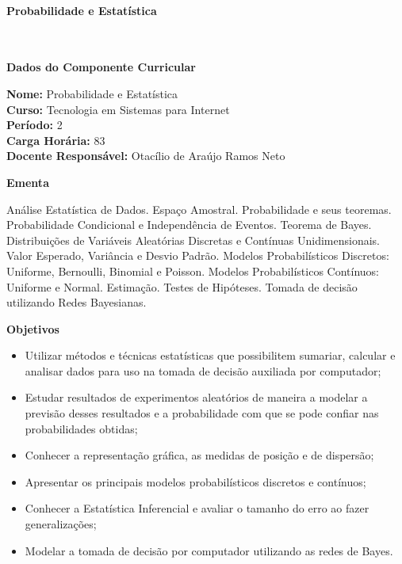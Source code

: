 \paragraph{Probabilidade e Estatística} \


\begin{snugshade}\begin{center}\textbf{
	Dados do Componente Curricular
}\end{center}\end{snugshade}

\noindent	\textbf{Nome:} Probabilidade e Estatística
\\ 			\textbf{Curso:} Tecnologia em Sistemas para Internet
\\ 			\textbf{Período:} \unit{2}{\degree}
\\ 			\textbf{Carga Horária:} \unit{83}{\hour}
\\ 			\textbf{Docente Responsável:} Otacílio de Araújo Ramos Neto


\begin{snugshade}\begin{center}\textbf{
    Ementa
\vphantom{q}}\end{center}\end{snugshade}

\noindent
Análise Estatística de Dados. Espaço Amostral. Probabilidade e seus teoremas. Probabilidade Condicional e Independência de Eventos. Teorema de Bayes. Distribuições de Variáveis Aleatórias Discretas e Contínuas Unidimensionais. Valor Esperado, Variância e Desvio Padrão. Modelos Probabilísticos Discretos: Uniforme, Bernoulli, Binomial e Poisson. Modelos Probabilísticos Contínuos: Uniforme e Normal. Estimação. Testes de Hipóteses. Tomada de decisão utilizando Redes Bayesianas.

\begin{snugshade}\begin{center}\textbf{
    Objetivos
}\end{center}\end{snugshade}

\begin{itemize}

\item Utilizar métodos e técnicas estatísticas que possibilitem sumariar, calcular e analisar dados para uso na tomada de decisão auxiliada por computador;
\item Estudar resultados de experimentos aleatórios de maneira a modelar a previsão desses resultados e a probabilidade com que se pode confiar nas probabilidades obtidas;
\item Conhecer a representação gráfica, as medidas de posição e de dispersão;
\item Apresentar os principais modelos probabilísticos discretos e contínuos;
\item Conhecer a Estatística Inferencial e avaliar o tamanho do erro ao fazer generalizações;
\item Modelar a tomada de decisão por computador utilizando as redes de Bayes.

\end{itemize} 

